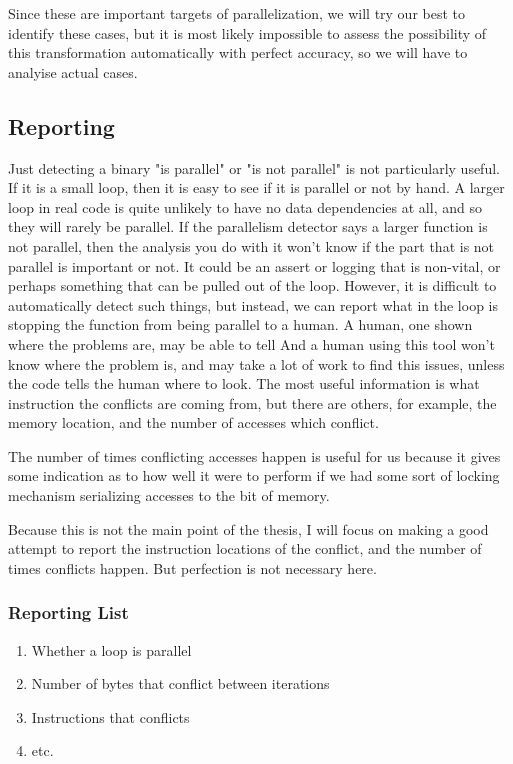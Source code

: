 \documentclass[12pt,twoside]{reedthesis}
\begin{document}
		Since these are important targets of parallelization, we will try our best to identify these cases, but it is most likely impossible to assess the possibility of this transformation automatically with perfect accuracy, so we will have to analyise actual cases. 
		
		\subsection{Reporting}
		
		Just detecting a binary "is parallel" or "is not parallel" is not particularly useful. If it is a small loop, then it is easy to see if it is parallel or not by hand. A larger loop in real code is quite unlikely to have no data dependencies at all, and so they will rarely be parallel. If the parallelism detector says a larger function is not parallel, then the analysis you do with it won't know if the part that is not parallel is important or not. It could be an assert or logging that is non-vital, or perhaps something that can be pulled out of the loop. However, it is difficult to automatically detect such things, but instead, we can report what in the loop is stopping the function from being parallel to a human. A human, one shown where the problems are, may be able to tell  And a human using this tool won't know where the problem is, and may take a lot of work to find this issues, unless the code tells the human where to look. The most useful information is what instruction the conflicts are coming from, but there are others, for example, the memory location, and the number of accesses which conflict. 
		
		The number of times conflicting accesses happen is useful for us because it gives some indication as to how well it were to perform if we had some sort of locking mechanism serializing accesses to the bit of memory. 
		
		Because this is not the main point of the thesis, I will focus on making a good attempt to report the instruction locations of the conflict, and the number of times conflicts happen. But perfection is not necessary here.
		
		\subsubsection{Reporting List}
		\begin{enumerate}
			\item Whether a loop is parallel
			\item Number of bytes that conflict between iterations
			\item Instructions that conflicts
			\item etc.
		\end{enumerate}
		
\end{document}
